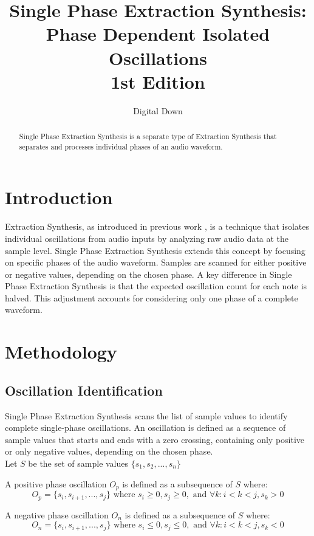 \documentclass[12pt,a4paper]{article}
\title{Single Phase Extraction Synthesis: Phase Dependent Isolated Oscillations\\ \small{1st Edition}}
\author{Digital Down}
\begin{document}
\maketitle

\begin{abstract}
Single Phase Extraction Synthesis is a separate type of Extraction Synthesis that separates and processes individual phases of an audio waveform.
\end{abstract}

\section{Introduction}
Extraction Synthesis, as introduced in previous work \cite{DigitalDown2024}, is a technique that isolates individual oscillations from audio inputs by analyzing raw audio data at the sample level. Single Phase Extraction Synthesis extends this concept by focusing on specific phases of the audio waveform. Samples are scanned for either positive or negative values, depending on the chosen phase. A key difference in Single Phase Extraction Synthesis is that the expected oscillation count for each note is halved. This adjustment accounts for considering only one phase of a complete waveform.

\section{Methodology}

\subsection{Oscillation Identification}
Single Phase Extraction Synthesis scans the list of sample values to identify complete single-phase oscillations. An oscillation is defined as a sequence of sample values that starts and ends with a zero crossing, containing only positive or only negative values, depending on the chosen phase.\\

Let $S$ be the set of sample values $\{s_1, s_2, ..., s_n\}$

A positive phase oscillation $O_p$ is defined as a subsequence of $S$ where:
\begin{equation*}
O_p = \{s_i, s_{i+1}, ..., s_j\} \text{ where } s_i \geq 0, s_j \geq 0, \text{ and } \forall k : i < k < j, s_k > 0
\end{equation*}

A negative phase oscillation $O_n$ is defined as a subsequence of $S$ where:
\begin{equation*}
O_n = \{s_i, s_{i+1}, ..., s_j\} \text{ where } s_i \leq 0, s_j \leq 0, \text{ and } \forall k : i < k < j, s_k < 0
\end{equation*}
\end{document}
